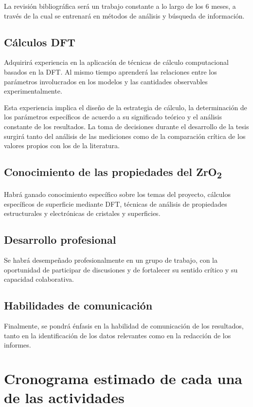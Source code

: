 La revisión bibliográfica será un trabajo constante a lo largo de los 6 meses, 
a través de la cual se entrenará en métodos de análisis y búsqueda de 
información.

\subsection{ Cálculos DFT}

Adquirirá experiencia en la aplicación de técnicas de cálculo computacional 
basados en la DFT. Al mismo tiempo aprenderá las relaciones entre los 
parámetros involucrados en los modelos y las cantidades observables 
experimentalmente.

Esta experiencia implica el diseño de la estrategia de cálculo, la 
determinación de los parámetros específicos de acuerdo a su significado teórico 
y el análisis constante de los resultados. La toma de decisiones durante el 
desarrollo de la tesis surgirá tanto del análisis de las mediciones como de la 
comparación crítica de los valores propios con los de la literatura.

\subsection{Conocimiento de las propiedades del  ZrO\textsubscript{2}}

Habrá ganado conocimiento específico sobre los temas del proyecto, 
cálculos específicos de superficie mediante DFT, técnicas de análisis
de propiedades estructurales y electrónicas de cristales y superficies. 

\subsection{ Desarrollo profesional}

Se habrá desempeñado profesionalmente en un grupo de trabajo, con la 
oportunidad de participar de discusiones y de fortalecer su sentido crítico y 
su capacidad colaborativa.

\subsection{ Habilidades de comunicación }

Finalmente, se pondrá énfasis en la habilidad de comunicación de los 
resultados, tanto en la identificación de los datos relevantes como en la 
redacción de los informes. 

\section{Cronograma estimado de cada una de las actividades}
 
